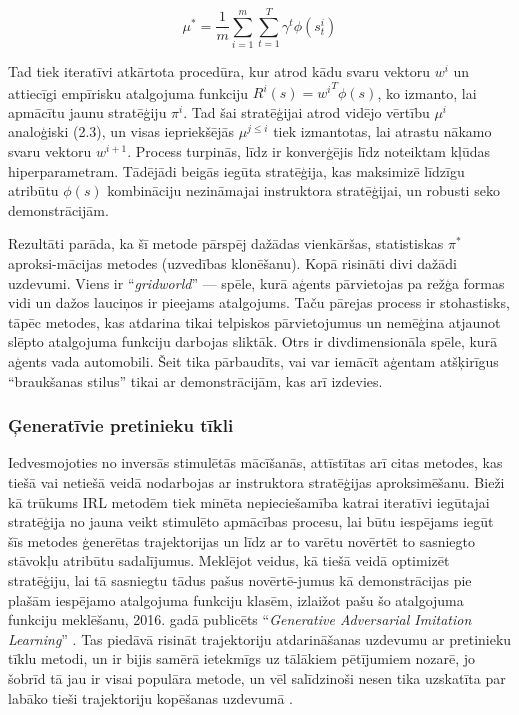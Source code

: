 \documentclass[12pt, a4paper]{article}
\numberwithin{equation}{section} %
\begin{document}
\begin{equation}
    \mu^* = \frac{1}{m}\sum_{i=1}^m\sum_{t=1}^T \gamma^t \phi(s^i_t)
\end{equation}

Tad tiek iteratīvi atkārtota procedūra, kur atrod kādu svaru vektoru $w^{i}$ un attiecīgi empīrisku atalgojuma funkciju $R^{i}(s) = {w^{i}}^T\phi(s)$, ko izmanto, lai apmācītu jaunu stratēģiju $\pi^i$. Tad šai stratēģijai atrod vidējo vērtību $\mu^i$ analoģiski (2.3), un visas iepriekšējās $\mu^{j \leq i}$ tiek izmantotas, lai atrastu nākamo svaru vektoru $w^{i+1}$. Process turpinās, līdz ir konverģējis līdz noteiktam kļūdas hiperparametram. Tādējādi beigās iegūta stratēģija, kas maksimizē līdzīgu atribūtu $\phi(s)$ kombināciju nezināmajai instruktora stratēģijai, un robusti seko demonstrācijām.

Rezultāti parāda, ka šī metode pārspēj dažādas vienkāršas, statistiskas $\pi^*$ aproksi-mācijas metodes (uzvedības klonēšanu). Kopā risināti divi dažādi uzdevumi. Viens ir ``\textit{gridworld}'' --- spēle, kurā aģents pārvietojas pa režģa formas vidi un dažos lauciņos ir pieejams atalgojums. Taču pārejas process ir stohastisks, tāpēc metodes, kas atdarina tikai telpiskos pārvietojumus un nemēģina atjaunot slēpto atalgojuma funkciju darbojas sliktāk. Otrs ir divdimensionāla spēle, kurā aģents vada automobili. Šeit tika pārbaudīts, vai var iemācīt aģentam atšķirīgus ``braukšanas stilus'' tikai ar demonstrācijām, kas arī izdevies.

\subsubsection{Ģeneratīvie pretinieku tīkli}


Iedvesmojoties no inversās stimulētās mācīšanās, attīstītas arī citas metodes, kas tiešā vai netiešā veidā nodarbojas ar instruktora stratēģijas aproksimēšanu. Bieži kā trūkums IRL metodēm tiek minēta nepieciešamība katrai iteratīvi iegūtajai stratēģija no jauna veikt stimulēto apmācības procesu, lai būtu iespējams iegūt šīs metodes ģenerētas trajektorijas un līdz ar to varētu novērtēt to sasniegto stāvokļu atribūtu sadalījumus. Meklējot veidus, kā tiešā veidā optimizēt stratēģiju, lai tā sasniegtu tādus pašus novērtē-jumus kā demonstrācijas pie plašām iespējamo atalgojuma funkciju klasēm, izlaižot pašu šo atalgojuma funkciju meklēšanu, 2016. gadā publicēts ``\textit{Generative Adversarial Imitation Learning}'' \cite{ho2016generative}. Tas piedāvā risināt trajektoriju atdarināšanas uzdevumu ar pretinieku tīklu metodi, un ir bijis samērā ietekmīgs uz tālākiem pētījumiem nozarē, jo šobrīd tā jau ir visai populāra metode, un vēl salīdzinoši nesen tika uzskatīta par labāko tieši trajektoriju kopēšanas uzdevumā \cite{torabi2018generative}.
\end{document}
